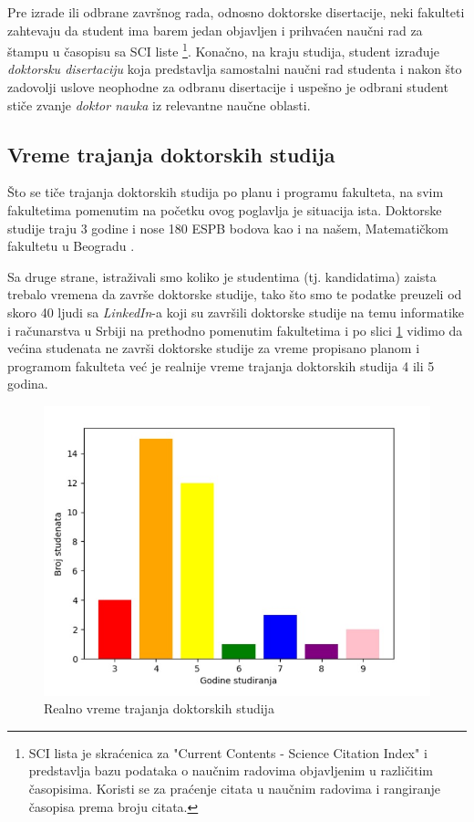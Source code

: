 \documentclass[a4paper]{article}
\begin{document}
Pre izrade ili odbrane završnog rada, odnosno doktorske disertacije, neki fakulteti zahtevaju da student ima barem jedan objavljen i prihvaćen naučni rad za štampu u časopisu sa SCI liste \footnote{SCI lista je skraćenica za "Current Contents - Science Citation Index" i predstavlja bazu podataka o naučnim radovima objavljenim u različitim časopisima. Koristi se za praćenje citata u naučnim radovima i rangiranje časopisa prema broju citata. }. Konačno, na kraju studija, student izrađuje \emph{doktorsku disertaciju} koja predstavlja samostalni naučni rad studenta i nakon što zadovolji uslove neophodne za odbranu disertacije i uspešno je odbrani student stiče zvanje \emph{doktor nauka} iz relevantne naučne oblasti.

\subsection{Vreme trajanja doktorskih studija}

Što se tiče trajanja doktorskih studija po planu i programu fakulteta, na svim fakultetima pomenutim na početku ovog poglavlja je situacija ista. Doktorske studije traju 3 godine i nose 180 ESPB bodova kao i na našem, Matematičkom fakultetu u Beogradu \cite{matfbgdoktorske}.


Sa druge strane, istraživali smo koliko je studentima (tj. kandidatima) zaista trebalo vremena da završe doktorske studije, tako što smo te podatke preuzeli od skoro 40 ljudi sa \emph{LinkedIn}-a koji su završili doktorske studije na temu informatike i računarstva u Srbiji na prethodno pomenutim fakultetima i po slici \ref{fig:statistics-bar} vidimo da većina studenata ne završi doktorske studije za vreme propisano planom i programom fakulteta već je realnije vreme trajanja doktorskih studija 4 ili 5 godina. 

\begin{figure}[h!]
\begin{center}
\includegraphics[scale=0.4]{DuzinaStudija.png}
\end{center}
\caption{Realno vreme trajanja doktorskih studija}
\label{fig:statistics-bar}
\end{figure}
\end{document}
